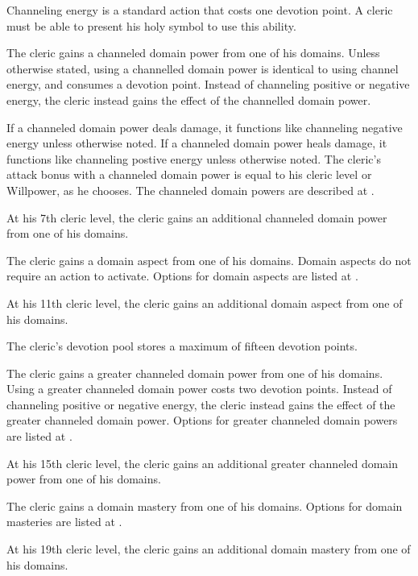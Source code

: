 Channeling energy is a standard action that costs one devotion point.
A cleric must be able to present his holy symbol to use this ability.

The cleric gains a channeled domain power from one of his domains.
Unless otherwise stated, using a channelled domain power is identical to using channel energy, and consumes a devotion point.
Instead of channeling positive or negative energy, the cleric instead gains the effect of the channelled domain power.

If a channeled domain power deals damage, it functions like channeling negative energy unless otherwise noted.
If a channeled domain power heals damage, it functions like channeling postive energy unless otherwise noted.
The cleric's attack bonus with a channeled domain power is equal to his cleric level or Willpower, as he chooses.
The channeled domain powers are described at .

At his 7th cleric level, the cleric gains an additional channeled domain power from one of his domains.

The cleric gains a domain aspect from one of his domains.
Domain aspects do not require an action to activate.
Options for domain aspects are listed at .

At his 11th cleric level, the cleric gains an additional domain aspect from one of his domains.

The cleric's devotion pool stores a maximum of fifteen devotion points.

The cleric gains a greater channeled domain power from one of his domains.
Using a greater channeled domain power costs two devotion points.
Instead of channeling positive or negative energy, the cleric instead gains the effect of the greater channeled domain power.
Options for greater channeled domain powers are listed at .

At his 15th cleric level, the cleric gains an additional greater channeled domain power from one of his domains.

The cleric gains a domain mastery from one of his domains.
Options for domain masteries are listed at .

At his 19th cleric level, the cleric gains an additional domain mastery from one of his domains.


